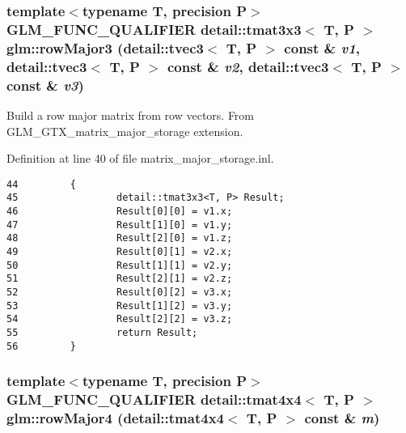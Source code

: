 \hypertarget{group__gtx__matrix__major__storage_g3839659b9641777b1bbc98122efc1320}{
\subsubsection[rowMajor3]{\setlength{\rightskip}{0pt plus 5cm}template$<$typename T, precision P$>$ GLM\_\-FUNC\_\-QUALIFIER detail::tmat3x3$<$ T, P $>$ glm::rowMajor3 (detail::tvec3$<$ T, P $>$ const \& {\em v1}, \/  detail::tvec3$<$ T, P $>$ const \& {\em v2}, \/  detail::tvec3$<$ T, P $>$ const \& {\em v3})}}
\label{group__gtx__matrix__major__storage_g3839659b9641777b1bbc98122efc1320}


Build a row major matrix from row vectors. From GLM\_\-GTX\_\-matrix\_\-major\_\-storage extension. 

Definition at line 40 of file matrix\_\-major\_\-storage.inl.

\begin{Code}\begin{verbatim}44         {
45                 detail::tmat3x3<T, P> Result;
46                 Result[0][0] = v1.x;
47                 Result[1][0] = v1.y;
48                 Result[2][0] = v1.z;
49                 Result[0][1] = v2.x;
50                 Result[1][1] = v2.y;
51                 Result[2][1] = v2.z;
52                 Result[0][2] = v3.x;
53                 Result[1][2] = v3.y;
54                 Result[2][2] = v3.z;
55                 return Result;
56         }
\end{verbatim}
\end{Code}


\hypertarget{group__gtx__matrix__major__storage_g77df85015848f4812005392d9c78b8a4}{
\subsubsection[rowMajor4]{\setlength{\rightskip}{0pt plus 5cm}template$<$typename T, precision P$>$ GLM\_\-FUNC\_\-QUALIFIER detail::tmat4x4$<$ T, P $>$ glm::rowMajor4 (detail::tmat4x4$<$ T, P $>$ const \& {\em m})}}
\label{group__gtx__matrix__major__storage_g77df85015848f4812005392d9c78b8a4}


